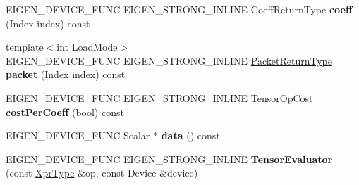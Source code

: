\begin{DoxyCompactItemize}
E\+I\+G\+E\+N\+\_\+\+D\+E\+V\+I\+C\+E\+\_\+\+F\+U\+NC E\+I\+G\+E\+N\+\_\+\+S\+T\+R\+O\+N\+G\+\_\+\+I\+N\+L\+I\+NE Coeff\+Return\+Type {\bfseries coeff} (Index index) const
\item 
\mbox{\label{struct_eigen_1_1_tensor_evaluator_3_01const_01_tensor_generator_op_3_01_generator_00_01_arg_type_01_4_00_01_device_01_4_a8db758a45389324db69f398291725809}} 
{\footnotesize template$<$int Load\+Mode$>$ }\\E\+I\+G\+E\+N\+\_\+\+D\+E\+V\+I\+C\+E\+\_\+\+F\+U\+NC E\+I\+G\+E\+N\+\_\+\+S\+T\+R\+O\+N\+G\+\_\+\+I\+N\+L\+I\+NE \hyperlink{group___sparse_core___module}{Packet\+Return\+Type} {\bfseries packet} (Index index) const
\item 
\mbox{\label{struct_eigen_1_1_tensor_evaluator_3_01const_01_tensor_generator_op_3_01_generator_00_01_arg_type_01_4_00_01_device_01_4_ac18fe15cee80407a1a1f350c969d3fe4}} 
E\+I\+G\+E\+N\+\_\+\+D\+E\+V\+I\+C\+E\+\_\+\+F\+U\+NC E\+I\+G\+E\+N\+\_\+\+S\+T\+R\+O\+N\+G\+\_\+\+I\+N\+L\+I\+NE \hyperlink{class_eigen_1_1_tensor_op_cost}{Tensor\+Op\+Cost} {\bfseries cost\+Per\+Coeff} (bool) const
\item 
\mbox{\label{struct_eigen_1_1_tensor_evaluator_3_01const_01_tensor_generator_op_3_01_generator_00_01_arg_type_01_4_00_01_device_01_4_a3a9bc7f34ee4521a257dff832dd400af}} 
E\+I\+G\+E\+N\+\_\+\+D\+E\+V\+I\+C\+E\+\_\+\+F\+U\+NC Scalar $\ast$ {\bfseries data} () const
\item 
\mbox{\label{struct_eigen_1_1_tensor_evaluator_3_01const_01_tensor_generator_op_3_01_generator_00_01_arg_type_01_4_00_01_device_01_4_a62d1d1629d1d7157d50ffea655f9ed3f}} 
E\+I\+G\+E\+N\+\_\+\+D\+E\+V\+I\+C\+E\+\_\+\+F\+U\+NC E\+I\+G\+E\+N\+\_\+\+S\+T\+R\+O\+N\+G\+\_\+\+I\+N\+L\+I\+NE {\bfseries Tensor\+Evaluator} (const \hyperlink{class_eigen_1_1_tensor_generator_op}{Xpr\+Type} \&op, const Device \&device)
\item 

\end{DoxyCompactItemize}

